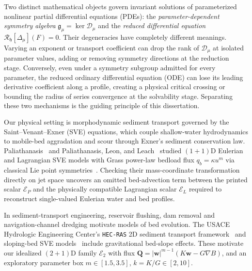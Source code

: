 \documentclass[12pt,a4paper,oneside]{report}
\numberwithin{equation}{chapter}
\theoremstyle{definition}
\theoremstyle{remark}\newtheorem{remark}[theorem]{Remark}
\begin{document}
Two distinct mathematical objects govern invariant solutions of parameterized nonlinear partial differential equations (PDEs): the \emph{parameter-dependent symmetry algebra} $\mathfrak g_\mu=\ker\mathscr D_\mu$ and the \emph{reduced differential equation} $\mathcal R_{\mathfrak h}[\Delta_\mu](F)=0$. Their degeneracies have completely different meanings. Varying an exponent or transport coefficient can drop the rank of $\mathscr D_\mu$ at isolated parameter values, adding or removing symmetry directions at the reduction stage. Conversely, even under a symmetry subgroup admitted for every parameter, the reduced ordinary differential equation (ODE) can lose its leading derivative coefficient along a profile, creating a physical critical crossing or bounding the radius of series convergence at the solvability stage. Separating these two mechanisms is the guiding principle of this dissertation.

Our physical setting is morphodynamic sediment transport governed by the Saint--Venant--Exner (SVE) equations, which couple shallow-water hydrodynamics to mobile-bed aggradation and scour through Exner's sediment conservation law. Paliathanasis~\cite{sve2022} and Paliathanasis, Leon, and Leach~\cite{sve2026} studied $(1+1)$D Eulerian and Lagrangian SVE models with Grass power-law bedload flux $q_b=\kappa u^m$ via classical Lie point symmetries~\cite{olver,oliveri}. Checking their mass-coordinate transformation directly on jet space uncovers an omitted bed-advection term between the printed scalar $\mathcal E_P$ and the physically compatible Lagrangian scalar $\mathcal E_L$ required to reconstruct single-valued Eulerian water and bed profiles.

In sediment-transport engineering, reservoir flushing, dam removal and navigation-channel dredging motivate models of bed evolution. The USACE Hydrologic Engineering Center's \texttt{HEC-RAS} 2D sediment transport framework~\cite[Sec.~2.9]{hecras2019} and sloping-bed SVE models~\cite{fernandez2017,burger2025} include gravitational bed-slope effects. These motivate our idealized $(2+1)$D family $\mathcal E_2$ with flux $\mathbf Q=|\mathbf w|^{m-1}(K\mathbf w-G\nabla B)$, and an exploratory parameter box $m\in[1.5,3.5]$, $k=K/G\in[2,10]$.
\end{document}
